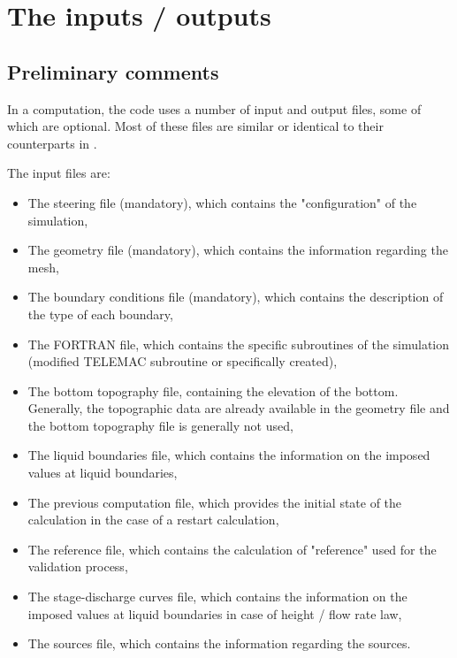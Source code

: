 \chapter{The inputs / outputs}

\section{Preliminary comments}

In a computation, the  code uses a number of input and output files,
some of which are optional. Most of these files are similar or identical to
their counterparts in .

The input files are:

\begin{itemize}
\item The steering file (mandatory), which contains the "configuration" of the
simulation,

\item The geometry file (mandatory), which contains the information regarding
the mesh,

\item The boundary conditions file (mandatory), which contains the description
of the type of each boundary,

\item The FORTRAN file, which contains the specific subroutines of the
simulation (modified TELEMAC subroutine or specifically created),

\item The bottom topography file, containing the elevation of the bottom.
Generally, the topographic data are already available in the
geometry file and the bottom topography file is generally not used,

\item The liquid boundaries file, which contains the information on the
imposed values at liquid boundaries,

\item The previous computation file, which provides the initial state of the
calculation in the case of a restart calculation,

\item The reference file, which contains the calculation of "reference" used
for the validation process,

\item The stage-discharge curves file, which contains the information on the
imposed values at liquid boundaries in case of height / flow rate law,

\item The sources file, which contains the information regarding the sources.
\end{itemize}

